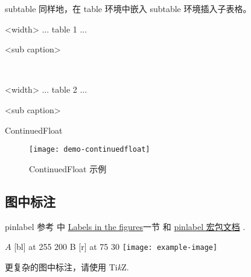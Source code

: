 \documentclass[final]{ctexbeamer}
\begin{document}
\begin{frame}[fragile]{subtable}
同样地，在 table 环境中嵌入 subtable 环境插入子表格。
\begin{texlst}
\begin{table}[<placement specifier>]
  \begin{subtable}{<width>}
      \centering
      ... table 1 ...
  \caption{<sub caption>}
  \end{subtable}
  ~
  \begin{subtable}{<width>}
      \centering
      ... table 2 ...
      \caption{<sub caption>}
  \end{subtable}
\end{table}
\end{texlst}
\end{frame}


\begin{frame}[fragile]{ContinuedFloat}
\end{frame}


\begin{frame}
\begin{figure}[]
  \centering
  \texttt{[image: demo-continuedfloat]}
  \caption{ContinuedFloat 示例}
  \label{demo-continuedfloat}
\end{figure}
\end{frame}



\subsection{图中标注}
% 
\begin{frame}[fragile]{pinlabel}
参考 \cite{wiki:floats} 中 \href{https://en.wikibooks.org/wiki/LaTeX/Floats,\_Figures\_and\_Captions\#Labels\_in\_the\_figures}{Labels in the figures}一节 和 \href{http://mirrors.ctan.org/macros/latex/contrib/pinlabel/pinlabdoc.pdf}{pinlabel 宏包文档} \cite{pinlabel}.
\begin{vertlst}
 \small\hair 2pt
\pinlabel $A$ [bl] at 255 200
\pinlabel B [r] at 75 30
\endlabellist
\centering
\texttt{[image: example-image]}
\end{vertlst}
更复杂的图中标注，请使用 Ti\emph{k}Z.
\end{frame}
\end{document}
